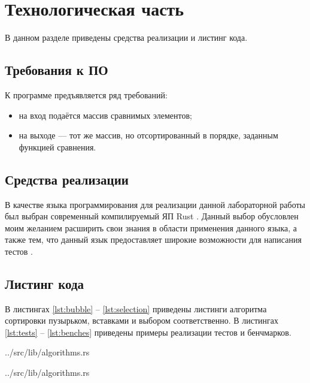 \chapter{Технологическая часть}

В данном разделе приведены средства реализации и листинг кода.

\section{Требования к ПО}

К программе предъявляется ряд требований:
\begin{itemize}
	\item на вход подаётся массив сравнимых элементов;
	\item на выходе — тот же массив, но отсортированный в порядке, заданным функцией сравнения.
\end{itemize}

\section{Средства реализации}

В качестве языка программирования для реализации данной лабораторной работы был выбран современный компилируемый ЯП Rust \cite{rustlang}. Данный выбор обусловлен моим желанием расширить свои знания в области применения данного языка, а также тем, что данный язык предоставляет широкие возможности для написания тестов \cite{rusttest}.

\section{Листинг кода}

В листингах \ref{lst:bubble} -- \ref{lst:selection} приведены листинги алгоритма сортировки пузырьком, вставками и выбором соответственно. В листингах \ref{lst:tests} -- \ref{lst:benches} приведены примеры реализации тестов и бенчмарков.

\begin{lstinputlisting}[
	caption={Алгоритм сортировки пузырьком},
	label={lst:bubble},
	style={rust},
	linerange={7-19}
]{../src/lib/algorithms.rs}
\end{lstinputlisting}

\begin{lstinputlisting}[
	caption={Алгоритм сортировки вставками},
	label={lst:insertions},
	style={rust},
	linerange={41-51}
]{../src/lib/algorithms.rs}
\end{lstinputlisting}

